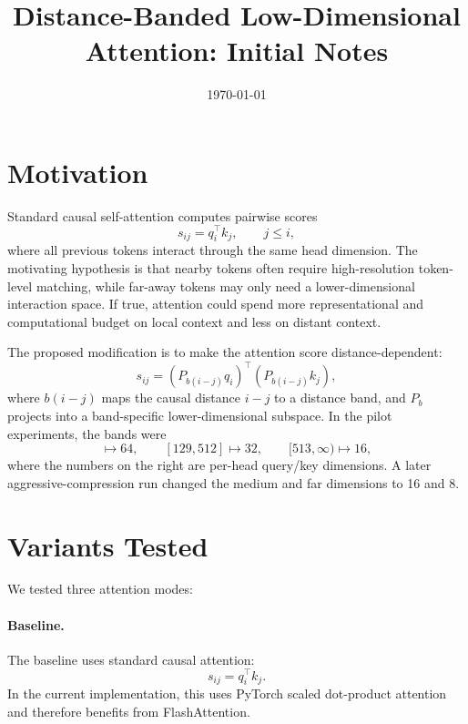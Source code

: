 \documentclass[11pt]{article}
\title{Distance-Banded Low-Dimensional Attention: Initial Notes}
\author{}
\date{\today}
\begin{document}
\maketitle

\section{Motivation}

Standard causal self-attention computes pairwise scores
\begin{equation}
    s_{ij} = q_i^\top k_j,
    \qquad j \leq i,
\end{equation}
where all previous tokens interact through the same head dimension. The motivating hypothesis is that nearby tokens often require high-resolution token-level matching, while far-away tokens may only need a lower-dimensional interaction space. If true, attention could spend more representational and computational budget on local context and less on distant context.

The proposed modification is to make the attention score distance-dependent:
\begin{equation}
    s_{ij} = (P_{b(i-j)} q_i)^\top (P_{b(i-j)} k_j),
\end{equation}
where $b(i-j)$ maps the causal distance $i-j$ to a distance band, and $P_b$ projects into a band-specific lower-dimensional subspace. In the pilot experiments, the bands were
\begin{equation}
    [0,128] \mapsto 64,\qquad
    [129,512] \mapsto 32,\qquad
    [513,\infty) \mapsto 16,
\end{equation}
where the numbers on the right are per-head query/key dimensions. A later aggressive-compression run changed the medium and far dimensions to 16 and 8.

\section{Variants Tested}

We tested three attention modes:

\paragraph{Baseline.}
The baseline uses standard causal attention:
\begin{equation}
    s_{ij} = q_i^\top k_j.
\end{equation}
In the current implementation, this uses PyTorch scaled dot-product attention and therefore benefits from FlashAttention.
\end{document}
